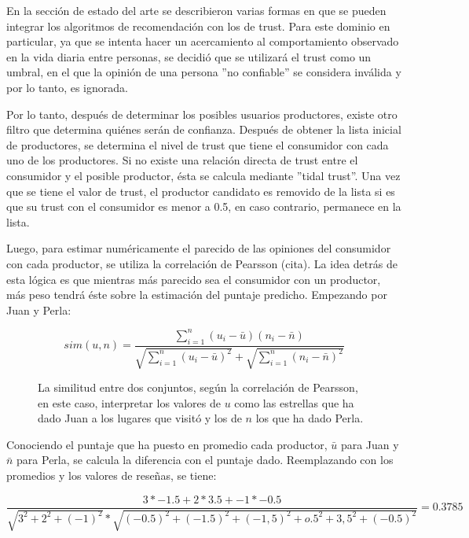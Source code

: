 En la sección de estado del arte se describieron varias formas en que se pueden integrar los algoritmos de recomendación con los de trust. Para este dominio en particular, ya que se intenta hacer un acercamiento al comportamiento observado en la vida diaria entre personas, se decidió que se utilizará el trust como un umbral, en el que la opinión de una persona ''no confiable'' se considera inválida y por lo tanto, es ignorada. 

Por lo tanto, después de determinar los posibles usuarios productores, existe otro filtro que determina quiénes serán de confianza. Después de obtener la lista inicial de productores, se determina el nivel de trust que tiene el consumidor con cada uno de los productores. Si no existe una relación directa de trust entre el consumidor y el posible productor, ésta se calcula mediante ''tidal trust''. Una vez que se tiene el valor de trust, el productor candidato es removido de la lista si es que su trust con el consumidor es menor a 0.5, en caso contrario, permanece en la lista. 

Luego, para estimar numéricamente el parecido de las opiniones del consumidor con cada productor, se utiliza la correlación de Pearsson (cita). La idea detrás de esta lógica es que mientras más parecido sea el consumidor con un productor, más peso tendrá éste sobre la estimación del puntaje predicho. Empezando por Juan y Perla:

\begin{figure}

\begin{equation}
sim(u,n)=\frac{\sum_{i=1}^{n}(u_i-\bar{u})(n_i-\bar{n})}{\sqrt{\sum_{i=1}^{n}(u_i-\bar{u})^2}+\sqrt{\sum_{i=1}^{n}(n_i-\bar{n})^2}}
\end{equation}
\caption{La similitud entre dos conjuntos, según la correlación de Pearsson, en este caso, interpretar los valores de $u$ como las estrellas que ha dado Juan a los lugares que visitó y los de $n$ los que ha dado Perla. }

\end{figure}
Conociendo el puntaje que ha puesto en promedio cada productor, $\bar{u}$ para Juan y $\bar{n}$ para Perla, se calcula la diferencia con el puntaje dado. Reemplazando con los promedios y los valores de reseñas, se tiene:


\begin{equation}
\frac{3*-1.5 + 2*3.5+-1*-0.5}{\sqrt{3^2+2^2+(-1)^2}*\sqrt{(-0.5)^2+(-1.5)^2+(-1,5)^2+o.5^2+3,5^2+(-0.5)^2}}  = 0.3785
\end{equation}


